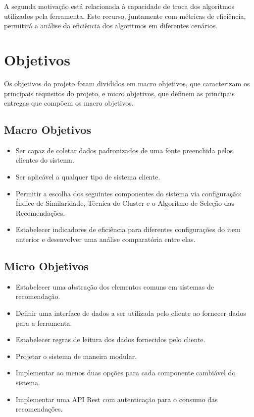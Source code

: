\documentclass[
	12pt,				%
    oneside,			%
	a4paper,			%
	english,			%
	french,				%
	spanish,			%
	brazil,				%
	]{abntex2}
\begin{document}
A segunda motivação está relacionada à capacidade de troca dos algoritmos utilizados pela ferramenta. Este recurso, juntamente com métricas de eficiência,
permitirá a análise da eficiência dos algoritmos em diferentes cenários.

\section{Objetivos}
Os objetivos do projeto foram divididos em macro objetivos, que caracterizam os principais requisitos do projeto, e micro objetivos, que definem as principais
entregas que compõem os macro objetivos.

\subsection{Macro Objetivos}
\begin{itemize}
	\item Ser capaz de coletar dados padronizados de uma fonte preenchida pelos clientes do sistema.
	\item Ser aplicável a qualquer tipo de sistema cliente.
	\item Permitir a escolha dos seguintes componentes do sistema via configuração: Índice de Similaridade, Técnica de Cluster e o Algoritmo de Seleção das Recomendações. 
	\item Estabelecer indicadores de eficiência para diferentes configurações do item anterior e desenvolver uma análise comparatória entre elas.
\end{itemize}

\subsection{Micro Objetivos}
\begin{itemize}
	\item Estabelecer uma abstração dos elementos comuns em sistemas de recomendação.
	\item Definir uma interface de dados a ser utilizada pelo cliente ao fornecer dados para a ferramenta.
	\item Estabelecer regras de leitura dos dados fornecidos pelo cliente.
	\item Projetar o sistema de maneira modular.
	\item Implementar ao menos duas opções para cada componente cambiável do sistema.
	\item Implementar uma API Rest com autenticação para o consumo das recomendações.
\end{itemize}
\end{document}
